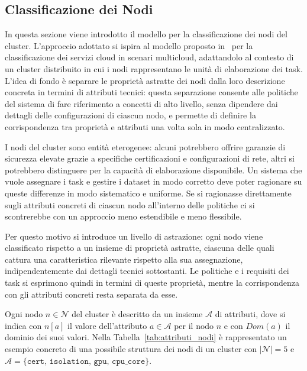
\subsection{Classificazione dei Nodi}
\label{subsec:classificazione_nodi}

In questa sezione viene introdotto il modello per la classificazione dei nodi del cluster. L'approccio adottato si ispira al modello proposto in~\cite{sec-aware-data-alloc-multicloud} per la classificazione dei servizi cloud in scenari multicloud, adattandolo al contesto di un cluster distribuito in cui i nodi rappresentano le unità di elaborazione dei task. L'idea di fondo è separare le proprietà astratte dei nodi dalla loro descrizione concreta in termini di attributi tecnici: questa separazione consente alle politiche del sistema di fare riferimento a concetti di alto livello, senza dipendere dai dettagli delle configurazioni di ciascun nodo, e permette di definire la corrispondenza tra proprietà e attributi una volta sola in modo centralizzato.

I nodi del cluster sono entità eterogenee: alcuni potrebbero offrire garanzie di sicurezza elevate grazie a specifiche certificazioni e configurazioni di rete, altri si potrebbero distinguere per la capacità di elaborazione disponibile. Un sistema che vuole assegnare i task e gestire i dataset in modo corretto deve poter ragionare su queste differenze in modo sistematico e uniforme. Se si ragionasse direttamente sugli attributi concreti di ciascun nodo all'interno delle politiche ci si scontrerebbe con un approccio meno estendibile e meno flessibile.

Per questo motivo si introduce un livello di astrazione: ogni nodo viene classificato rispetto a un insieme di proprietà astratte, ciascuna delle quali cattura una caratteristica rilevante rispetto alla sua assegnazione, indipendentemente dai dettagli tecnici sottostanti. Le politiche e i requisiti dei task si esprimono quindi in termini di queste proprietà, mentre la corrispondenza con gli attributi concreti resta separata da esse.

Ogni nodo $n \in \mathcal{N}$ del cluster è descritto da un insieme $\mathcal{A}$ di attributi, dove si indica con $n[a]$ il valore dell'attributo $a \in \mathcal{A}$ per il nodo $n$ e con $Dom(a)$ il dominio dei suoi valori. Nella Tabella~\ref{tab:attributi_nodi} è rappresentato un esempio concreto di una possibile struttura dei nodi di un cluster con $\lvert \mathcal{N} \rvert = 5$ e $\mathcal{A} = \{\mathtt{cert},\, \mathtt{isolation},\, \mathtt{gpu},\, \mathtt{cpu\_core}\}$.

